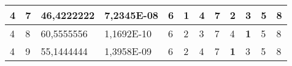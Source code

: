 \documentclass[conference]{IEEEtran}
\begin{document}
\begin{table*}[]
\begin{tabular}{|llll|llllllll|}
\multicolumn{1}{|l|}{4}                                                     & \multicolumn{1}{l|}{7}                                                        & \multicolumn{1}{l|}{46,4222222}                                                   & 7,2345E-08                     & \multicolumn{1}{l|}{6}                                                  & \multicolumn{1}{l|}{\textbf{1}}                                         & \multicolumn{1}{l|}{4}                                                  & \multicolumn{1}{l|}{7}                                                  & \multicolumn{1}{l|}{2}                                                  & \multicolumn{1}{l|}{3}                                                  & \multicolumn{1}{l|}{5}                                                  & 8                          \\ \hline
\multicolumn{1}{|l|}{4}                                                     & \multicolumn{1}{l|}{8}                                                        & \multicolumn{1}{l|}{60,5555556}                                                   & 1,1692E-10                     & \multicolumn{1}{l|}{6}                                                  & \multicolumn{1}{l|}{2}                                                  & \multicolumn{1}{l|}{3}                                                  & \multicolumn{1}{l|}{7}                                                  & \multicolumn{1}{l|}{4}                                                  & \multicolumn{1}{l|}{\textbf{1}}                                         & \multicolumn{1}{l|}{5}                                                  & 8                          \\ \hline
\multicolumn{1}{|l|}{4}                                                     & \multicolumn{1}{l|}{9}                                                        & \multicolumn{1}{l|}{55,1444444}                                                   & 1,3958E-09                     & \multicolumn{1}{l|}{6}                                                  & \multicolumn{1}{l|}{2}                                                  & \multicolumn{1}{l|}{4}                                                  & \multicolumn{1}{l|}{7}                                                  & \multicolumn{1}{l|}{\textbf{1}}                                         & \multicolumn{1}{l|}{3}                                                  & \multicolumn{1}{l|}{5}                                                  & 8                          \\ \hline

\end{tabular}
\end{table*}
\end{document}
